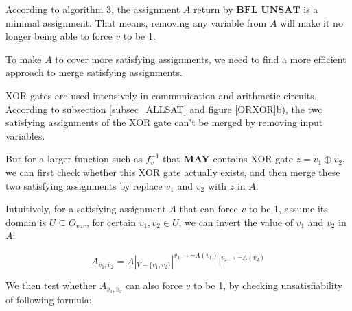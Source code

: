 \documentclass[journal]{IEEEtran}
\begin{document}


According to algorithm 3,
the assignment $A$ return by $\boldsymbol{BFL\_UNSAT}$ is a minimal assignment.
That means,
removing any variable from $A$ will make it no longer being able to force $v$ to be 1.

To make $A$ to cover more satisfying assignments,
we need to find a more efficient approach to merge satisfying assignments.

XOR gates are used intensively in communication and arithmetic circuits.
According to subsection \ref{subsec_ALLSAT} and figure \ref{ORXOR}b),
the two satisfying assignments of the XOR gate can't be merged by removing input variables.

But for a larger function such as $f^{-1}_v$ that \textbf{MAY} contains XOR gate $z=v_1 \oplus v_2$,
we can first check whether this XOR gate actually exists,
and then merge these two satisfying assignments by replace $v_1$ and $v_2$ with $z$ in $A$.

Intuitively,
for a satisfying assignment $A$ that can force $v$ to be 1,
assume its domain is $U\subseteq O_{var}$,
for certain $v_1,v_2\in U$,
we can invert the value of $v_1$ and $v_2$ in $A$:

\begin{equation}
A_{\overline{v}_1,\overline{v}_2}=A|_{V-\{v_1,v_2\}}|^{v_1\to \neg A(v_1)}|^{v_2\to \neg A(v_2)}
\end{equation}

We then test whether $A_{\overline{v}_1,\overline{v}_2}$ can also force $v$ to be 1,
by checking unsatisfiability of following formula:
\end{document}

